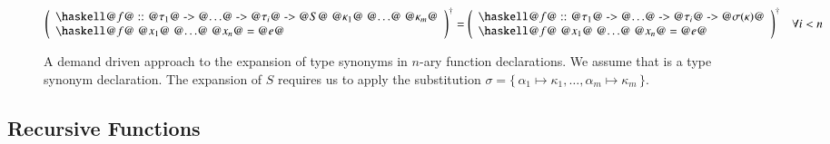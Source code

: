 \begin{figure}[H]
  \begin{align*}
    \toCoq{\left(
      \begin{array}{l}
        \haskellM{@$f$@ :: @$\tau_1$@ -> @$\ldots$@ -> @$\tau_i$@ -> @$S$@ @$\kappa_1$@ @$\ldots$@ @$\kappa_m$@} \\
        \haskellM{@$f$@ @$x_1$@ @$\ldots$@ @$x_n$@ = @$e$@}
      \end{array}
    \right)}
    = \toCoq{\left(
      \begin{array}{l}
        \haskellM{@$f$@ :: @$\tau_1$@ -> @$\ldots$@ -> @$\tau_i$@ -> @$\sigma(\kappa)$@} \\
        \haskellM{@$f$@ @$x_1$@ @$\ldots$@ @$x_n$@ = @$e$@}
      \end{array}
    \right)}
    &&\forall i < n
  \end{align*}
  \caption{
    A demand driven approach to the expansion of type synonyms in $n$-ary function declarations.
    We assume that  is a type synonym declaration.
    The expansion of $S$ requires us to apply the substitution $\sigma = \{\, \alpha_1 \mapsto \kappa_1, \ldots, \alpha_m \mapsto \kappa_m \,\}$.
  }
  \label{fig:translation:func-decl:non-rec:expansion}
\end{figure}

\subsection{Recursive Functions}
